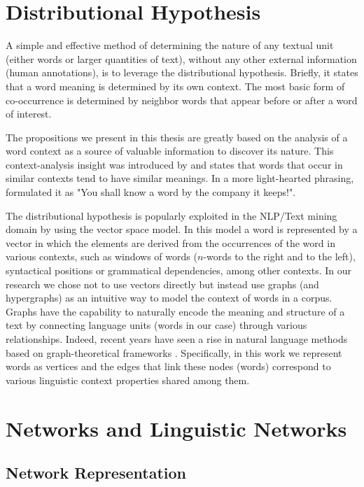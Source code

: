 \section{Distributional Hypothesis}

A simple and effective method of determining the nature of any textual unit (either words or larger quantities of text), without any other external information (human annotations), is to leverage the distributional hypothesis. Briefly, it states that a word meaning is determined by its own context. The most basic form of co-occurrence is determined by neighbor words that appear before or after a word of interest.

The propositions we present in this thesis are greatly based on the analysis of a word context as a source of valuable information   to discover its nature. This context-analysis insight was introduced by \cite{harris1954} and states that words that occur in similar contexts tend to have similar meanings. In a more light-hearted phrasing, \cite{firth57synopsis} formulated it as "You shall know a word by the company it keeps!".

The distributional hypothesis is popularly exploited in the NLP/Text mining domain by using the vector space model. In this model a word is represented by a vector in which the elements are derived from the occurrences of the word in various contexts, such as windows of words ($n$-words to the right and to the left), syntactical positions or grammatical dependencies,  among other contexts. In our research we chose not to use vectors directly but instead use graphs (and hypergraphs) as an intuitive way to model the context of words in a corpus. Graphs have the capability to naturally encode the meaning and structure of a text by connecting language units (words in our case) through various relationships. Indeed, recent years have seen a rise in natural language methods based on graph-theoretical frameworks \cite{Mihalcea2011}. Specifically, in this work we represent words as vertices and the edges that link these nodes (words) correspond to various linguistic context properties shared among them. 


\section{Networks and Linguistic Networks}
\subsection{Network Representation}

